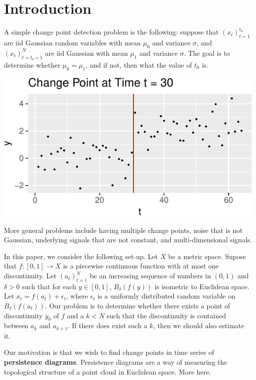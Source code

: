 \documentclass[smallextended]{svjour3}       %
\begin{document}
\section{Introduction}\label{intro}

A simple change point detection problem is the following: suppose that
\((x_t)_{t = 1}^{t_0}\) are iid Gaussian random variables with mean
\(\mu_0\) and variance \(\sigma\), and \((x_t)_{t = t_0 + 1}^N\) are iid
Gaussian with mean \(\mu_1\) and variance \(\sigma\). The goal is to
determine whether \(\mu_0 = \mu_1\), and if not, then what the value of
\(t_0\) is.

\begin{center}\includegraphics{springer_template_files/figure-latex/chunk_1-1} \end{center}

More general problems include having multiple change points, noise that
is not Gaussian, underlying signals that are not constant, and
multi-dimensional signals.

In this paper, we consider the following set-up. Let \(X\) be a metric
space. Supose that \(f:[0,1]\to X\) is a piecewise continuous function
with at most one discontinuity. Let \((a_t)_{t = 1}^N\) be an increasing
sequence of numbers in \((0, 1)\) and \(\delta > 0\) such that for each
\(y\in [0,1]\), \(B_\delta(f(y))\) is isometric to Euclidean space. Let
\(x_t = f(a_t) + \epsilon_t\), where \(\epsilon_t\) is a uniformly
distributed random variable on \(B_\delta(f(a_t))\). Our problem is to
determine whether there exists a point of discontinuity \(y_0\) of \(f\)
and a \(k < N\) such that the discontinuity is contained between \(a_k\)
and \(a_{k +1}\). If there does exist such a \(k\), then we should also
estimate it.

Our motivation is that we wish to find change points in time series of
\textbf{persistence diagrams}. Persistence diagrams are a way of
measuring the topological structure of a point cloud in Euclidean space.
More here.
\end{document}
